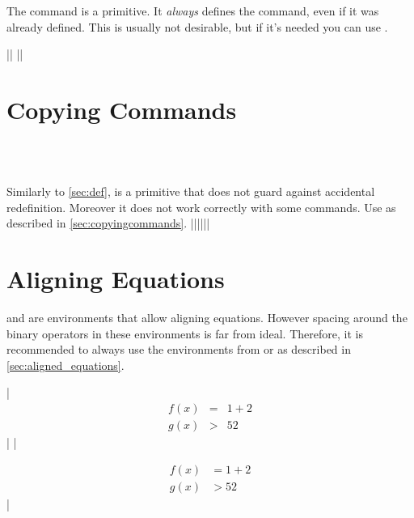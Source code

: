 The  command is a  primitive. It \emph{always} defines
the command, even if it was already defined. This is usually not desirable, but
if it's needed you can use .
\begin{chktexignore}
  \vchto|\def\foo#1#2#3{ ... }|
  ||
\end{chktexignore}

\section{Copying Commands}
 {
   \\
   \\
}

Similarly to \autoref{sec:def},  is a  primitive that
does not guard against accidental redefinition. Moreover it does not work
correctly with some  commands. Use  as
described in \autoref{sec:copyingcommands}.
\chto|\let\foo\bar||\NewCommandCopy\foo\bar|

\section{Aligning Equations}

 and  are  environments that allow
aligning equations. However spacing around the binary operators in these environments is far
from ideal. Therefore, it is recommended to always use the  environments
from  or  as described in
\autoref{sec:aligned_equations}.
\begin{chktexignore}
\chto
|\begin{eqnarray}
  f(x) & = &  1 + 2 \\
  g(x) & > & 52
\end{eqnarray}|
|\usepackage{amsmath}
\begin{align}
  f(x) & = 1 + 2 \\
  g(x) & > 52
\end{align}|
\end{chktexignore}

